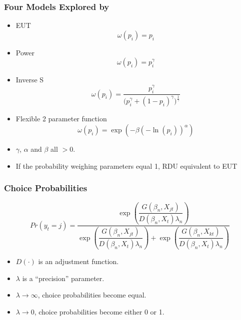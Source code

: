 \documentclass{beamer}
\newcommand\Prob{\ensuremath{\mathit{Pr}}}  %
\begin{document}
\begin{frame}
\frametitle{Four Models Explored by \textcite{Harrison2016}}
\begin{itemize}
	\item EUT
		\begin{equation}
			\label{eq4:pw:eut}
			\omega(p_i) = p_i
		\end{equation}
	\item Power \parencite{Quiggin1982}
		\begin{equation}
			\label{eq4:pw:pow}
			\omega(p_i)=p_i^\gamma
		\end{equation}
	\item Inverse S \parencite{Kahneman1979}
		\begin{equation}
			\label{eq4:pw:inv}
			\omega(p_i) = \frac{p_i^\gamma}{\biggl(p_i^\gamma + {(1-p_i)}^\gamma\biggr)^{ \frac{1}{\gamma} } }
		\end{equation}
	\item Flexible 2 parameter function \parencite{Prelec1998}
		\begin{equation}
			\label{eq4:pw:pre}
			\omega(p_i)=\exp(-\beta(-\ln(p_i))^\alpha)
		\end{equation}

	\item $\gamma$, $\alpha$ and $\beta$ all $> 0$.
	\item If the probability weighing parameters equal 1, RDU equivalent to EUT

\end{itemize}
\end{frame}

\begin{frame}
\frametitle{Choice Probabilities}
\begin{equation}
	\label{eq4:RE.f}
	{\Prob}(y_t=j) =\dfrac{\exp\!\left( \dfrac{ G(\beta_n,X_{jt}) }{ D(\beta_n,X_{t})\lambda_n }  \right)}{  \exp\!\left( \dfrac{ G(\beta_n,X_{jt}) }{ D(\beta_n,X_{t})\lambda_n }  \right) + \exp\!\left( \dfrac{ G(\beta_n,X_{kt}) }{ D(\beta_n,X_{t})\lambda_n }  \right)    }
\end{equation}
\begin{itemize}
	\item $D(\cdot)$ is an adjustment function.
	\item $\lambda$ is a \enquote{precision} parameter.
	\item $\lambda \rightarrow \infty$, choice probabilities become equal.
	\item $\lambda \rightarrow 0$, choice probabilities become either 0 or 1.
	
\end{itemize}
\end{frame}
\end{document}
